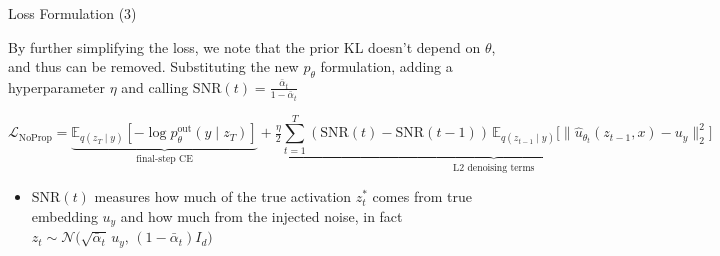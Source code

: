 \documentclass{beamer}
\begin{document}
\begin{frame}{Loss Formulation (3)}

By further simplifying the loss, we note that the prior KL doesn't depend on $\theta$, and thus can be removed. Substituting the new $p_\theta$ formulation, adding a hyperparameter $\eta$ and calling $\mathrm{SNR}(t) = \frac{\bar \alpha_t}{1-\bar\alpha_t}$


\begin{dmath*}
  \mathcal{L}_{\mathrm{NoProp}}
  = \underbrace{\mathbb{E}_{q(z_T\mid y)}[-\log p_{\theta}^{\mathrm{out}}(y\mid z_T)]}_{\text{final‐step CE}}
  + \underbrace{\tfrac{\eta}{2}\sum_{t=1}^T(\mathrm{SNR}(t)-\mathrm{SNR}(t-1))\,\mathbb{E}_{q(z_{t-1}\mid y)}\big [\|\hat u_{\theta_t}(z_{t-1},x)-u_y\|^2_2 \big]}_{\text{L2 denoising terms}}
\end{dmath*}

\begin{itemize}
    \item $\mathrm{SNR}(t)$ measures how much of the true activation $z_t^*$ comes from true embedding $u_y$ and how much from the injected noise, in fact $ z_{t} \sim \mathcal{N}\big(\sqrt{\bar\alpha_{t}} \, u_y, \, (1-\bar\alpha_{t}) I_d\big) $
\end{itemize}


\end{frame}
\end{document}
